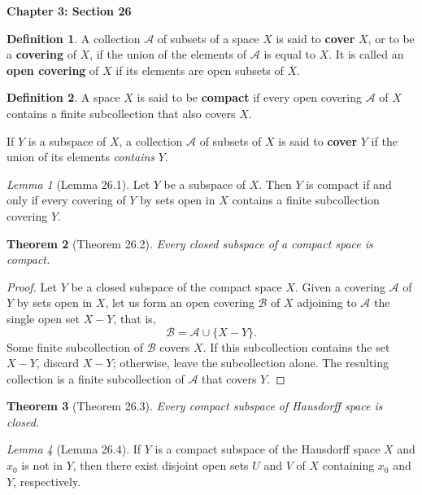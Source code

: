 \documentclass{article}
\newtheorem{theorem}{Theorem}
\theoremstyle{definition}
\newtheorem{definition}{Definition}[section]
\theoremstyle{remark}
\newtheorem{lemma}[theorem]{Lemma}
\begin{document}
    \newpage

    \textbf{Chapter 3: Section 26}

    \begin{definition}
        A collection $\mathcal{A}$ of subsets of a space $X$ is said to \textbf{cover} $X$, or to be a \textbf{covering} of $X$,
        if the union of the elements of $\mathcal{A}$ is equal to $X$. It is called an \textbf{open covering} of $X$ if its elements
        are open subsets of $X$.
    \end{definition}

    \begin{definition}
        A space $X$ is said to be \textbf{compact} if every open covering $\mathcal{A}$ of $X$ contains a finite subcollection that
        also covers $X$.
    \end{definition}

    If $Y$ is a subspace of $X$, a collection $\mathcal{A}$ of subsets of $X$ is said to \textbf{cover} $Y$ if the union of its
    elements \textit{contains} $Y$.

    \begin{lemma}[Lemma 26.1]
        Let $Y$ be a subspace of $X$. Then $Y$ is compact if and only if every covering of $Y$ by sets open in $X$ contains a finite
        subcollection covering $Y$.
    \end{lemma}

    \begin{theorem}[Theorem 26.2]
        Every closed subspace of a compact space is compact.
    \end{theorem}
    \begin{proof}
        Let $Y$ be a closed subspace of the compact space $X$. Given a covering $\mathcal{A}$ of $Y$ by sets open in $X$, let us
        form an open covering $\mathcal{B}$ of $X$ adjoining to $\mathcal{A}$ the single open set $X-Y$, that is,
        \[ \mathcal{B} = \mathcal{A} \cup \{X-Y\}. \]
        Some finite subcollection of $\mathcal{B}$ covers $X$. If this subcollection contains the set $X-Y$, discard $X-Y$; otherwise,
        leave the subcollection alone. The resulting collection is a finite subcollection of $\mathcal{A}$ that covers $Y$.
    \end{proof}

    \begin{theorem}[Theorem 26.3]
        Every compact subspace of Hausdorff space is closed.
    \end{theorem}

    \begin{lemma}[Lemma 26.4]
        If $Y$ is a compact subspace of the Hausdorff space $X$ and $x_0$ is not in $Y$, then there exist disjoint open sets
        $U$ and $V$ of $X$ containing $x_0$ and $Y$, respectively.
    \end{lemma}
\end{document}
